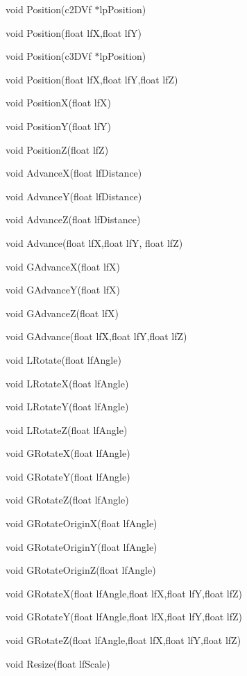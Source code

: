  void Position(c2DVf $\ast$lpPosition) \par
 void Position(float lfX,float lfY) \par
 void Position(c3DVf $\ast$lpPosition) \par
 void Position(float lfX,float lfY,float lfZ) \par
 void PositionX(float lfX) \par
 void PositionY(float lfY) \par
 void PositionZ(float lfZ) \par
 \par
 void AdvanceX(float lfDistance) \par
 void AdvanceY(float lfDistance) \par
 void AdvanceZ(float lfDistance) \par
 void Advance(float lfX,float lfY, float lfZ) \par
 \par
 void GAdvanceX(float lfX) \par
 void GAdvanceY(float lfX) \par
 void GAdvanceZ(float lfX) \par
 void GAdvance(float lfX,float lfY,float lfZ) \par
 \par
 void LRotate(float lfAngle) \par
 void LRotateX(float lfAngle) \par
 void LRotateY(float lfAngle) \par
 void LRotateZ(float lfAngle) \par
 \par
 void GRotateX(float lfAngle) \par
 void GRotateY(float lfAngle) \par
 void GRotateZ(float lfAngle) \par
 \par
 void GRotateOriginX(float lfAngle) \par
 void GRotateOriginY(float lfAngle) \par
 void GRotateOriginZ(float lfAngle) \par
 \par
 void GRotateX(float lfAngle,float lfX,float lfY,float lfZ) \par
 void GRotateY(float lfAngle,float lfX,float lfY,float lfZ) \par
 void GRotateZ(float lfAngle,float lfX,float lfY,float lfZ) \par
 \par
 void Resize(float lfScale) \par

